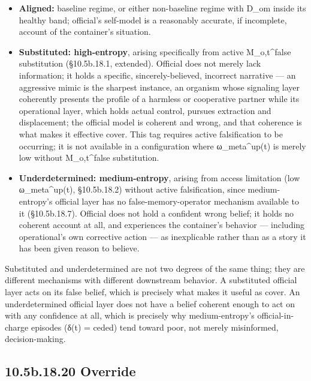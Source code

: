 \documentclass[
]{article}
\begin{document}
\begin{itemize}
\item
  \textbf{Aligned:} baseline regime, or either non-baseline regime with
  D\_om inside its healthy band; official's self-model is a reasonably
  accurate, if incomplete, account of the container's situation.
\item
  \textbf{Substituted: high-entropy}, arising specifically from active
  M\_o,t\^{}false substitution (§10.5b.18.1, extended). Official does
  not merely lack information; it holds a specific, sincerely-believed,
  incorrect narrative --- an aggressive mimic is the sharpest instance,
  an organism whose signaling layer coherently presents the profile of a
  harmless or cooperative partner while its operational layer, which
  holds actual control, pursues extraction and displacement; the
  official model is coherent and wrong, and that coherence is what makes
  it effective cover. This tag requires active falsification to be
  occurring; it is not available in a configuration where
  ω\_meta\^{}up(t) is merely low without M\_o,t\^{}false substitution.
\item
  \textbf{Underdetermined: medium-entropy}, arising from access
  limitation (low ω\_meta\^{}up(t), §10.5b.18.2) without active
  falsification, since medium-entropy's official layer has no
  false-memory-operator mechanism available to it (§10.5b.18.7).
  Official does not hold a confident wrong belief; it holds no coherent
  account at all, and experiences the container's behavior --- including
  operational's own corrective action --- as inexplicable rather than as
  a story it has been given reason to believe.
\end{itemize}

Substituted and underdetermined are not two degrees of the same thing;
they are different mechanisms with different downstream behavior. A
substituted official layer acts on its false belief, which is precisely
what makes it useful as cover. An underdetermined official layer does
not have a belief coherent enough to act on with any confidence at all,
which is precisely why medium-entropy's official-in-charge episodes
(δ(t) = ceded) tend toward poor, not merely misinformed,
decision-making.

\hypertarget{b.18.20-override}{%
\subsection{10.5b.18.20 Override}\label{b.18.20-override}}
\end{document}
